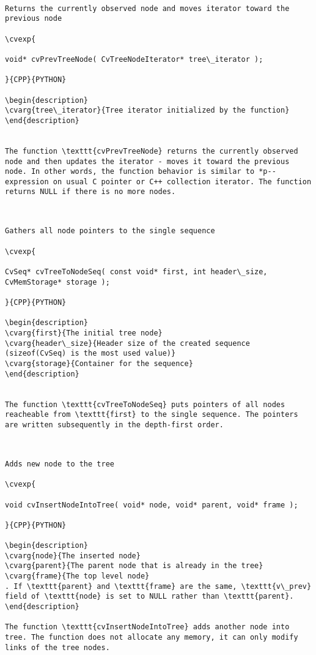 \begin{verbatim}

Returns the currently observed node and moves iterator toward the previous node

\cvexp{

void* cvPrevTreeNode( CvTreeNodeIterator* tree\_iterator );

}{CPP}{PYTHON}

\begin{description}
\cvarg{tree\_iterator}{Tree iterator initialized by the function}
\end{description}


The function \texttt{cvPrevTreeNode} returns the currently observed node and then updates the iterator - moves it toward the previous node. In other words, the function behavior is similar to *p-- expression on usual C pointer or C++ collection iterator. The function returns NULL if there is no more nodes.


\end{verbatim}
\begin{verbatim}

Gathers all node pointers to the single sequence

\cvexp{

CvSeq* cvTreeToNodeSeq( const void* first, int header\_size, CvMemStorage* storage );

}{CPP}{PYTHON}

\begin{description}
\cvarg{first}{The initial tree node}
\cvarg{header\_size}{Header size of the created sequence (sizeof(CvSeq) is the most used value)}
\cvarg{storage}{Container for the sequence}
\end{description}


The function \texttt{cvTreeToNodeSeq} puts pointers of all nodes reacheable from \texttt{first} to the single sequence. The pointers are written subsequently in the depth-first order.


\end{verbatim}
\begin{verbatim}

Adds new node to the tree

\cvexp{

void cvInsertNodeIntoTree( void* node, void* parent, void* frame );

}{CPP}{PYTHON}

\begin{description}
\cvarg{node}{The inserted node}
\cvarg{parent}{The parent node that is already in the tree}
\cvarg{frame}{The top level node}
. If \texttt{parent} and \texttt{frame} are the same, \texttt{v\_prev} field of \texttt{node} is set to NULL rather than \texttt{parent}.
\end{description}

The function \texttt{cvInsertNodeIntoTree} adds another node into tree. The function does not allocate any memory, it can only modify links of the tree nodes.


\end{verbatim}
